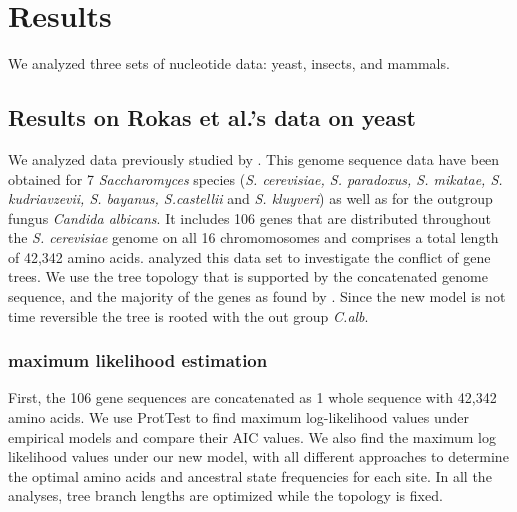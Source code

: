 \section{Results}

We analyzed three sets of nucleotide data: yeast, insects, and mammals.

\subsection{Results on Rokas et al.'s data on yeast}
We analyzed data previously studied by \citet{rokas2003nature}.
This genome sequence data have been obtained for 7 {\it Saccharomyces} species ({\it S. cerevisiae, S. paradoxus, S. mikatae, S. kudriavzevii, S. bayanus, S.castellii} and {\it S. kluyveri}) as well as for the outgroup fungus {\it Candida albicans}.
It includes 106 genes that are distributed throughout the {\it S. cerevisiae} genome on all 16 chromomosomes and comprises a total length of 42,342 amino acids.
\citet{rokas2003nature} analyzed this data set to investigate the conflict of gene trees.
We use the tree topology that is supported by the concatenated genome sequence, and the majority of the genes as found by \citet{rokas2003nature}.
Since the new model is not time reversible the tree is rooted with the out group {\it C.alb}.\\

\subsubsection{maximum likelihood estimation}
First, the 106 gene sequences are concatenated as 1 whole sequence with 42,342 amino acids.
We use ProtTest \citep{prottest, Guindon2003phyml} to find maximum log-likelihood values under empirical models and compare their AIC values.
We also find the maximum log likelihood values under our new model, with all different approaches to determine the optimal amino acids and ancestral state frequencies for each site.
In all the analyses, tree branch lengths are optimized while the topology is fixed. \\

